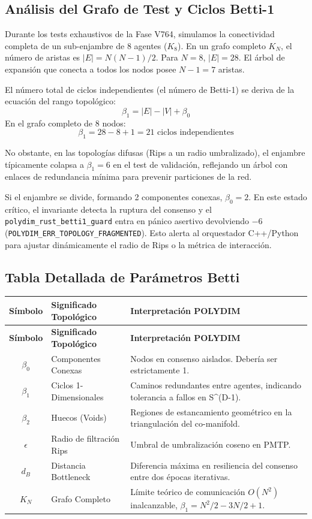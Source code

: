 \subsection{Análisis del Grafo de Test y Ciclos Betti-1}

Durante los tests exhaustivos de la Fase V764, simulamos la conectividad completa de un sub-enjambre de 8 agentes ($K_8$). En un grafo completo $K_N$, el número de aristas es $|E| = N(N-1)/2$. Para $N=8$, $|E| = 28$. El árbol de expansión que conecta a todos los nodos posee $N-1 = 7$ aristas. 

El número total de ciclos independientes (el número de Betti-1) se deriva de la ecuación del rango topológico:
$$ \beta_1 = |E| - |V| + \beta_0 $$
En el grafo completo de 8 nodos:
$$ \beta_1 = 28 - 8 + 1 = 21 \text{ ciclos independientes} $$

No obstante, en las topologías difusas (Rips a un radio umbralizado), el enjambre típicamente colapsa a $\beta_1 = 6$ en el test de validación, reflejando un árbol con enlaces de redundancia mínima para prevenir particiones de la red. 

Si el enjambre se divide, formando 2 componentes conexas, $\beta_0 = 2$. En este estado crítico, el invariante detecta la ruptura del consenso y el \texttt{polydim\_rust\_betti1\_guard} entra en pánico asertivo devolviendo $-6$ (\texttt{POLYDIM\_ERR\_TOPOLOGY\_FRAGMENTED}). Esto alerta al orquestador C++/Python para ajustar dinámicamente el radio de Rips o la métrica de interacción.

\subsection{Tabla Detallada de Parámetros Betti}
\begin{longtable}{|c|p{4cm}|p{6cm}|}
\hline
\textbf{Símbolo} & \textbf{Significado Topológico} & \textbf{Interpretación POLYDIM} \\
\hline
\endfirsthead
\hline
\textbf{Símbolo} & \textbf{Significado Topológico} & \textbf{Interpretación POLYDIM} \\
\hline
\endhead
$\beta_0$ & Componentes Conexas & Nodos en consenso aislados. Debería ser estrictamente 1. \\
\hline
$\beta_1$ & Ciclos 1-Dimensionales & Caminos redundantes entre agentes, indicando tolerancia a fallos en S^(D-1). \\
\hline
$\beta_2$ & Huecos (Voids) & Regiones de estancamiento geométrico en la triangulación del co-manifold. \\
\hline
$\epsilon$ & Radio de filtración Rips & Umbral de umbralización coseno en PMTP. \\
\hline
$d_B$ & Distancia Bottleneck & Diferencia máxima en resiliencia del consenso entre dos épocas iterativas. \\
\hline
$K_N$ & Grafo Completo & Límite teórico de comunicación $O(N^2)$ inalcanzable, $\beta_1 = N^2/2 - 3N/2 + 1$. \\
\hline
\end{longtable}

